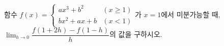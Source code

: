 함수 $f(x)=\begin{cases} ax^3+b^2 & (x\ge 1) \\ bx^2+ax+b & (x<1) \end{cases}$가 $x=1$에서 미분가능할 때, $\displaystyle\lim_{h\to 0}\dfrac{f(1+2h)-f(1-h)}{h}$의 값을 구하시오. 
